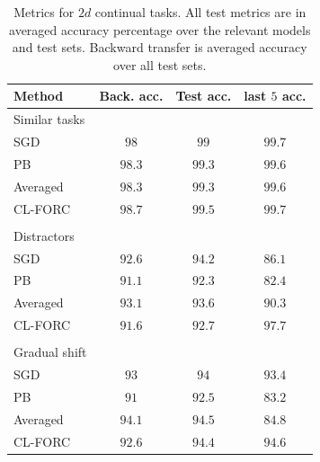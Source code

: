 \documentclass{article}
\theoremstyle{plain}
\theoremstyle{definition}
\theoremstyle{remark}
\newcommand{\RM}[1]{{\textcolor{magenta}{#1}}}
\begin{document}


\begin{table}[t]
\caption{Metrics for $2d$ continual tasks. All test metrics are in averaged accuracy percentage over the relevant models and test sets. Backward transfer is averaged accuracy over all test sets.}
\label{2d-full-table}
\vskip 0.15in
\begin{center}
\begin{small}
\begin{sc}
\begin{tabular}{lccc}
\toprule
Method & Back. acc. & Test acc. & last $5$ acc. \\
\midrule
Similar tasks & & & \\
\midrule
SGD    & $98$ & $99$ & $\mathbf{99.7}$ \\
PB & $98.3$ & $99.3$ & $99.6$\\
Averaged    & $98.3$ & $99.3$ & $99.6$ \\
CL-FORC    & $\mathbf{98.7}$& $\mathbf{99.5}$ & $\mathbf{99.7}$        \\

\\Distractors & & & \\
\midrule
SGD    & $92.6$ & $\mathbf{94.2}$ & $86.1$ \\
PB & $91.1$ & $92.3$ & $82.4$\\
Averaged    & $\mathbf{93.1}$ & $93.6$ & $90.3$ \\
CL-FORC    & $91.6$& $92.7$ & $\mathbf{97.7}$        \\

\\ Gradual shift & & & \\
\midrule
SGD    & $93$ & $94$ & $93.4$ \\
PB & $91$ & $92.5$ & $83.2$\\
Averaged    & $\mathbf{94.1}$ & $\mathbf{94.5}$ & $84.8$ \\
CL-FORC    & $92.6$& $94.4$ & $\mathbf{94.6}$        \\


\end{tabular}
\end{sc}
\end{small}
\end{center}
\end{table}
\end{document}
